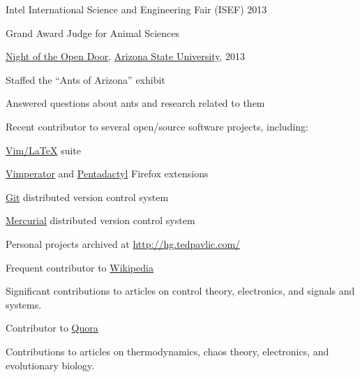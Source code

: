 \documentclass[10pt]{article}
\newcommand{\halfblankline}{\quad\vspace{-0.5\baselineskip}\pagebreak[3]}
\begin{document}
\halfblankline

Intel International Science and Engineering Fair (ISEF) 2013
\begin{innerlist}
    \item Grand Award Judge for Animal Sciences
\end{innerlist}

\halfblankline

\href{http://opendoor.asu.edu}{Night of the Open Door},
\href{http://www.asu.edu}{Arizona State University},
2013
%
\begin{innerlist}
    \item Staffed the ``Ants of Arizona'' exhibit
    \item Answered questions about ants and research related to them
\end{innerlist}

\halfblankline

Recent contributor to several open\-/source software projects, including:
\begin{innerlist}
    \item \href{http://vim-latex.sourceforge.net/}{Vim\-/LaTeX} suite
    \item \href{http://vimperator.org}{Vimperator} and
        \href{http://dactyl.sourceforge.net/pentadactyl/index}{Pentadactyl}
        Firefox extensions
    \item \href{http://git-scm.com}{Git} distributed version control
        system
    \item \href{http://www.selenic.com/mercurial/}{Mercurial} distributed version control
        system
    \item Personal projects archived at
        \url{http://hg.tedpavlic.com/}
\end{innerlist}

\halfblankline

Frequent contributor to \href{http://www.wikipedia.org/}{Wikipedia}
%
\begin{innerlist}
    \item Significant contributions to articles on control theory,
        electronics, and signals and systems.
\end{innerlist}

\halfblankline

Contributor to \href{http://www.quora.com/}{Quora}
%
\begin{innerlist}
    \item Contributions to articles on thermodynamics, chaos theory,
        electronics, and evolutionary biology.
\end{innerlist}
\end{document}
